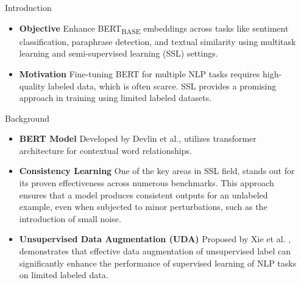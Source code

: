 \documentclass[final]{beamer}
\newlength{\sepwidth}
\newlength{\colwidth}
\newcommand{\separatorcolumn}{\begin{column}{\sepwidth}\end{column}}
\begin{document}
\begin{frame}[t]
\begin{columns}[t]
\separatorcolumn

\begin{column}{\colwidth}

  \begin{block}{Introduction}
    \begin{itemize}
        \item \textbf{Objective} Enhance BERT\textsubscript{BASE} embeddings across tasks like sentiment classification, paraphrase detection, and textual similarity using multitask learning and semi-supervised learning (SSL) settings.
        \item \textbf{Motivation} Fine-tuning BERT for multiple NLP tasks requires high-quality labeled data, which is often scarce. SSL provides a promising approach in training using
        limited labeled datasets.
    \end{itemize}
  \end{block}

  \begin{block}{Background}
    \begin{itemize}
      \item \textbf{BERT Model} Developed by Devlin et al., utilizes transformer architecture for contextual word relationships.
      \item \textbf{Consistency Learning} One of the key areas in SSL field, stands out for its proven effectiveness across numerous benchmarks.
      This approach ensures that a model produces consistent outputs for an unlabeled example, even when subjected to minor perturbations, such as the introduction of small noise.
      \item \textbf{Unsupervised Data Augmentation (UDA)} Proposed by Xie et al. \cite{xie2020unsupervised}, demonstrates that effective data augmentation of unsupervised
      label can significantly enhance the performance of supervised learning of NLP tasks on 
      limited labeled data.
    \end{itemize}
  \end{block}
  

\end{column}
\end{columns}
\end{frame}
\end{document}
